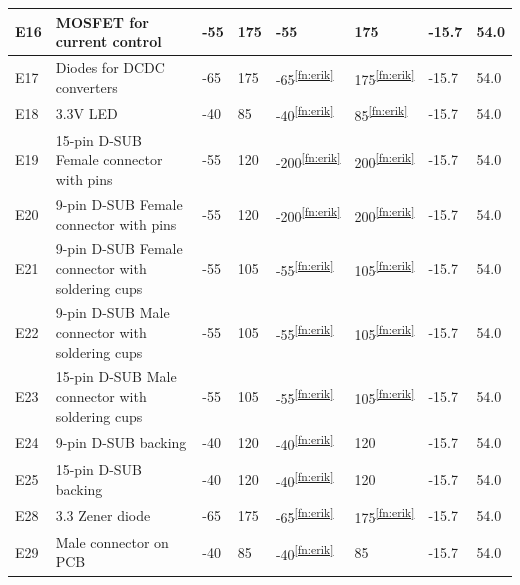\documentclass[a4paper,12pt,oneside]{article}
\begin{document}
\begin{appendices}
\begin{longtable}{|m{1cm}|m{3.5cm}|m{1.3cm}|m{1.3cm}|m{1.4cm}|m{1.3cm}|m{1.3cm}|m{1.3cm}|}
E16 & MOSFET for current control & -55 & 175 & -55 & 175 & -15.7 & 54.0 \\ \hline
E17 & Diodes for DCDC converters & -65 & 175 & -65\textsuperscript{\ref{fn:erik}} & 175\textsuperscript{\ref{fn:erik}} & -15.7 & 54.0 \\ \hline
E18 & 3.3V LED & -40 & 85 & -40\textsuperscript{\ref{fn:erik}} & 85\textsuperscript{\ref{fn:erik}} & -15.7 & 54.0 \\ \hline 
E19 & 15-pin D-SUB Female connector with pins & -55 & 120 & -200\textsuperscript{\ref{fn:erik}} & 200\textsuperscript{\ref{fn:erik}} & -15.7 & 54.0 \\ \hline
E20 & 9-pin D-SUB Female connector with pins & -55 & 120  & -200\textsuperscript{\ref{fn:erik}} & 200\textsuperscript{\ref{fn:erik}} & -15.7 & 54.0 \\ \hline
E21 & 9-pin D-SUB Female connector with soldering cups & -55 & 105 & -55\textsuperscript{\ref{fn:erik}} & 105\textsuperscript{\ref{fn:erik}} & -15.7 & 54.0 \\ \hline
E22 & 9-pin D-SUB Male connector with soldering cups & -55 & 105 & -55\textsuperscript{\ref{fn:erik}} & 105\textsuperscript{\ref{fn:erik}} & -15.7 & 54.0 \\ \hline
E23 & 15-pin D-SUB Male connector with soldering cups & -55  & 105 & -55\textsuperscript{\ref{fn:erik}} & 105\textsuperscript{\ref{fn:erik}} & -15.7 & 54.0 \\ \hline
E24 & 9-pin D-SUB backing & -40 & 120 & -40\textsuperscript{\ref{fn:erik}} & 120 & -15.7 & 54.0  \\ \hline
E25 & 15-pin D-SUB backing & -40 & 120 & -40\textsuperscript{\ref{fn:erik}} & 120 & -15.7 & 54.0  \\ \hline
E28 & 3.3 Zener diode & -65 & 175 & -65\textsuperscript{\ref{fn:erik}} & 175\textsuperscript{\ref{fn:erik}} & -15.7 & 54.0 \\ \hline
E29 & Male connector on PCB & -40 & 85 & -40\textsuperscript{\ref{fn:erik}} & 85 & -15.7 & 54.0 \\ \hline

\end{longtable}
\end{appendices}
\end{document}
